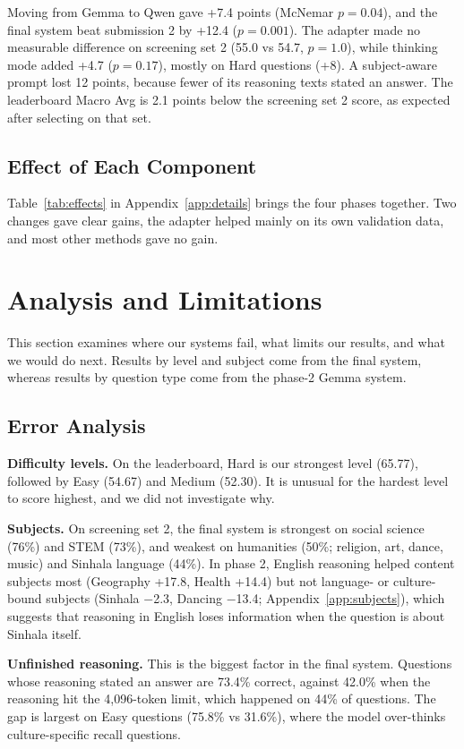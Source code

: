 \documentclass[11pt]{article}
\newcommand{\para}[1]{\smallskip\noindent\textbf{#1}\enspace}
\begin{document}
Moving from Gemma to Qwen gave +7.4 points (McNemar $p=0.04$), and the final system beat submission 2 by +12.4 ($p=0.001$). The adapter made no measurable difference on screening set 2 (55.0 vs 54.7, $p=1.0$), while thinking mode added +4.7 ($p=0.17$), mostly on Hard questions (+8). A subject-aware prompt lost 12 points, because fewer of its reasoning texts stated an answer. The leaderboard Macro Avg is 2.1 points below the screening set 2 score, as expected after selecting on that set.

\subsection{Effect of Each Component}\label{sec:effects}
Table~\ref{tab:effects} in Appendix~\ref{app:details} brings the four phases together. Two changes gave clear gains, the adapter helped mainly on its own validation data, and most other methods gave no gain.

\section{Analysis and Limitations}\label{sec:limits}
This section examines where our systems fail, what limits our results, and what we would do next. Results by level and subject come from the final system, whereas results by question type come from the phase-2 Gemma system.

\subsection{Error Analysis}
\para{Difficulty levels.} On the leaderboard, Hard is our strongest level (65.77), followed by Easy (54.67) and Medium (52.30). It is unusual for the hardest level to score highest, and we did not investigate why.

\para{Subjects.} On screening set 2, the final system is strongest on social science (76\%) and STEM (73\%), and weakest on humanities (50\%; religion, art, dance, music) and Sinhala language (44\%). In phase 2, English reasoning helped content subjects most (Geography +17.8, Health +14.4) but not language- or culture-bound subjects (Sinhala $-$2.3, Dancing $-$13.4; Appendix~\ref{app:subjects}), which suggests that reasoning in English loses information when the question is about Sinhala itself.

\para{Unfinished reasoning.} This is the biggest factor in the final system. Questions whose reasoning stated an answer are 73.4\% correct, against 42.0\% when the reasoning hit the 4,096-token limit, which happened on 44\% of questions. The gap is largest on Easy questions (75.8\% vs 31.6\%), where the model over-thinks culture-specific recall questions.
\end{document}
